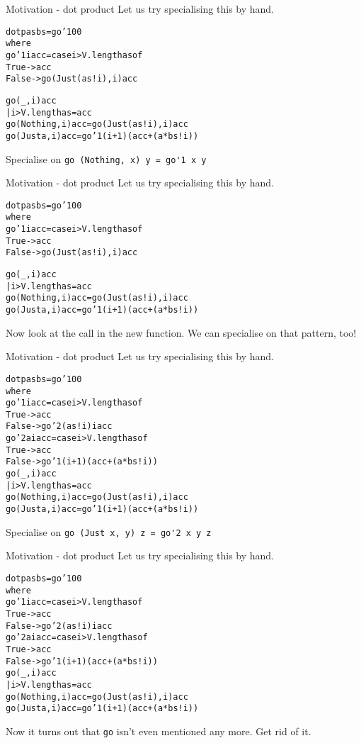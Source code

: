 \documentclass[t]{beamer}
\newcommand{\oomph}[1]{\textcolor[rgb]{0.0,0.5,0.9}{#1}}
\begin{document}
\begin{frame}[fragile]{Motivation - dot product}
Let us try specialising this by hand.
\begin{alltt}
dotp as bs = \oomph{go'1 0 0}
 where
  \oomph{go'1 i acc = case i > V.length as of
   True  -> acc
   False -> go (Just (as!i), i) acc}



  go (_, i) acc
   | i > V.length as  = acc
  go (Nothing, i) acc = go (Just (as!i), i) acc
  go (Just a,  i) acc = \oomph{go'1 (i + 1) (acc + (a * bs!i))}
\end{alltt}
Specialise on \verb/go (Nothing, x) y = go'1 x y/
\end{frame}

\begin{frame}[fragile]{Motivation - dot product}
Let us try specialising this by hand.
\begin{alltt}
dotp as bs = go'1 0 0
 where
  go'1 i acc = case i > V.length as of
   True  -> acc
   False -> \oomph{go (Just (as!i), i) acc}



  go (_, i) acc
   | i > V.length as  = acc
  go (Nothing, i) acc = go (Just (as!i), i) acc
  go (Just a,  i) acc = go'1 (i + 1) (acc + (a * bs!i))
\end{alltt}
Now look at the call in the new function. We can specialise on that pattern, too!
\end{frame}

\begin{frame}[fragile]{Motivation - dot product}
Let us try specialising this by hand.
\begin{alltt}
dotp as bs = go'1 0 0
 where
  go'1 i acc = case i > V.length as of
   True  -> acc
   False -> \oomph{go'2 (as!i) i acc}
  \oomph{go'2 a i acc = case i > V.length as of
   True  -> acc
   False -> go'1 (i + 1) (acc + (a * bs!i))}
  go (_, i) acc
   | i > V.length as  = acc
  go (Nothing, i) acc = go (Just (as!i), i) acc
  go (Just a,  i) acc = go'1 (i + 1) (acc + (a * bs!i))
\end{alltt}
Specialise on \verb/go (Just x, y) z = go'2 x y z/
\end{frame}

\begin{frame}[fragile]{Motivation - dot product}
Let us try specialising this by hand.
\begin{alltt}
dotp as bs = go'1 0 0
 where
  go'1 i acc = case i > V.length as of
   True  -> acc
   False -> go'2 (as!i) i acc
  go'2 a i acc = case i > V.length as of
   True  -> acc
   False -> go'1 (i + 1) (acc + (a * bs!i))
  \oomph{go (_, i) acc
   | i > V.length as  = acc
  go (Nothing, i) acc = go (Just (as!i), i) acc
  go (Just a,  i) acc = go'1 (i + 1) (acc + (a * bs!i))}
\end{alltt}
Now it turns out that \verb/go/ isn't even mentioned any more. Get rid of it.
\end{frame}
\end{document}
